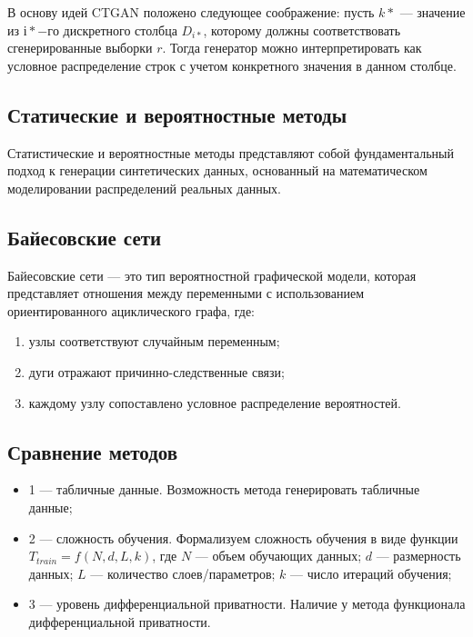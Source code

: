 В основу идей CTGAN положено следующее соображение: пусть $k*$ --- значение из $і*-го$ дискретного столбца $D_{i*}$, которому должны соответствовать сгенерированные выборки $r$.
Тогда генератор можно интерпретировать как условное распределение строк с учетом конкретного значения в данном столбце.

\subsection{Статические и вероятностные методы}

Статистические и вероятностные методы представляют собой фундаментальный подход к генерации синтетических данных, основанный на математическом моделировании распределений реальных данных.

\subsection{Байесовские сети}

Байесовские сети --- это тип вероятностной графической модели,
которая представляет отношения между переменными с использованием
ориентированного ациклического графа, где:
\begin{enumerate}
	\item узлы соответствуют случайным переменным;
	\item дуги отражают причинно-следственные связи;
	\item каждому узлу сопоставлено условное распределение вероятностей.
\end{enumerate}

\subsection{Сравнение методов}
\begin{itemize}[label*=---]
	\item 1 ---  табличные данные. Возможность метода генерировать табличные данные;
	\item 2 --- сложность обучения. Формализуем сложность обучения в виде функции $T_{train} = f(N, d, L, k)$, где $N$ --- объем обучающих данных; $d$ --- размерность данных; $L$ --- количество слоев/параметров; $k$ --- число итераций обучения;
	\item 3 --- уровень дифференциальной приватности. Наличие у метода функционала дифференциальной приватности.
\end{itemize}

